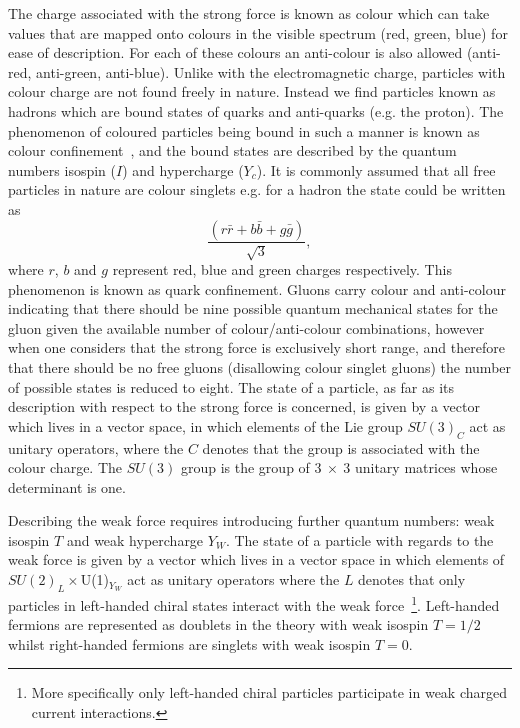 The charge associated with the strong force is known as colour which can take
values that are mapped onto colours in the visible spectrum (red, green, blue)
for ease of description. For each of these colours an anti-colour is also
allowed (anti-red, anti-green, anti-blue). Unlike with the electromagnetic
charge, particles with colour charge are not found freely in nature. Instead we
find particles known as hadrons which are bound states of quarks and anti-quarks
(e.g. the proton). The phenomenon of coloured particles being bound in such a
manner is known as colour confinement~\cite{colour-confinement}, and the bound
states are described by the quantum numbers isospin ($I$) and hypercharge
($Y_c$). It is commonly assumed that all free particles in nature are colour
singlets e.g. for a hadron the state could be written as
\begin{equation}
  \label{eq:hadron-colour} \frac{(r\bar{r} + b\bar{b} + g\bar{g})}{\sqrt{3}},
\end{equation} where $r$, $b$ and $g$ represent red, blue and green charges
respectively. This phenomenon is known as quark confinement. Gluons carry colour
and anti-colour indicating that there should be nine possible quantum mechanical
states for the gluon given the available number of colour/anti-colour
combinations, however when one considers that the strong force is exclusively
short range, and therefore that there should be no free gluons (disallowing
colour singlet gluons) the number of possible states is reduced to eight. The
state of a particle, as far as its description with respect to the strong force
is concerned, is given by a vector which lives in a vector space, in which
elements of the Lie group $SU(3)_C$ act as unitary operators, where the $C$
denotes that the group is associated with the colour charge. The $SU(3)$ group
is the group of $3~\times~3$ unitary matrices whose determinant is one.

Describing the weak force requires introducing further quantum numbers: weak
isospin $T$ and weak hypercharge $Y_W$. The state of a particle with regards to
the weak force is given by a vector which lives in a vector space in which
elements of $SU(2)_L \times $U(1)$_{Y_{W}}$ act as unitary operators where the
$L$ denotes that only particles in left-handed chiral states interact with the
weak force~\footnote{More specifically only left-handed chiral particles
participate in weak charged current interactions.}. Left-handed fermions are
represented as doublets in the theory with weak isospin $T = 1/2$ whilst
right-handed fermions are singlets with weak isospin $T = 0$.

